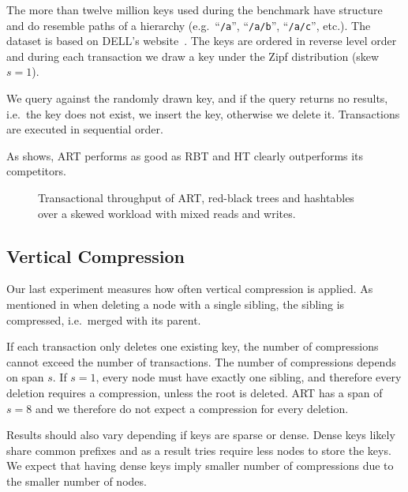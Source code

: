\documentclass[abstracton,12pt]{scrartcl}
\theoremstyle{definition}
\begin{document}
The more than twelve million keys used during the benchmark have structure
and do resemble paths of a hierarchy (e.g.\ ``\texttt{/a}'', ``\texttt{/a/b}'',
``\texttt{/a/c}'', etc.). The dataset is based on DELL's 
website~\cite{wellenzohn2017wapi}.
The keys are ordered in reverse level order and during each transaction we
draw a key under the Zipf distribution (skew $s=1$).

We query against the randomly drawn key, and if the query returns no results,
i.e.\ the key does not exist, we insert the key, otherwise we delete it.
Transactions are executed in sequential order.

As  shows, ART performs as good as RBT and HT clearly
outperforms its competitors.

\begin{figure}[H]
  \centering
  \caption{Transactional throughput of ART,
    red-black trees and hashtables over a skewed workload with
    mixed reads and writes.}
  \label{fig:main-benchmark}
\end{figure}

\subsection{Vertical Compression}
\label{sec:compression-benchmark}

Our last experiment measures how often vertical compression is applied.
As mentioned in  when deleting a node with
a single sibling, the sibling is compressed, i.e.\ merged with its parent.

If each transaction only deletes one existing key, the number of compressions
cannot exceed the number of transactions. The number of compressions
depends on span $s$. If $s=1$, every node must have exactly one sibling,
and therefore every deletion requires a compression, unless the root is
deleted. ART has a span of $s=8$ and we therefore do not expect a compression 
for every deletion.

Results should also vary depending if keys are sparse or dense. Dense keys
likely share common prefixes and as a result tries require less nodes to 
store the keys. We expect that having dense keys imply smaller number
of compressions due to the smaller number of nodes.
\end{document}
